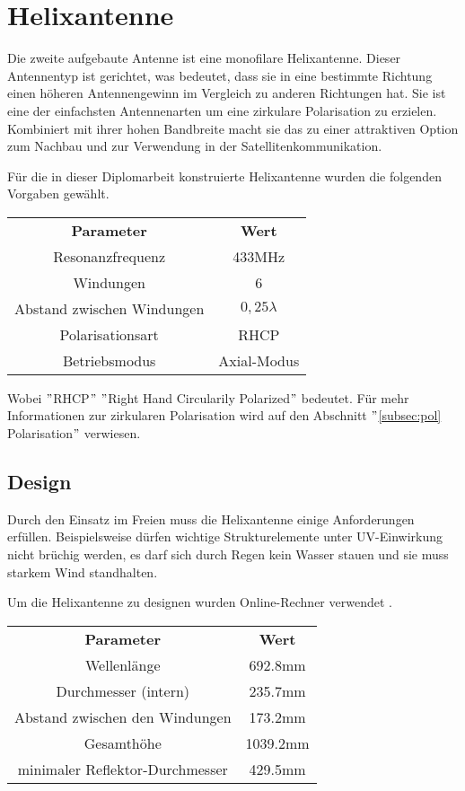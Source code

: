 \chapter{Helixantenne}
Die zweite aufgebaute Antenne ist eine monofilare Helixantenne. Dieser Antennentyp ist gerichtet, was bedeutet, dass sie in eine bestimmte Richtung einen höheren Antennengewinn im Vergleich zu anderen Richtungen hat. Sie ist eine der einfachsten Antennenarten um eine zirkulare Polarisation zu erzielen. Kombiniert mit ihrer hohen Bandbreite macht sie das zu einer attraktiven Option zum Nachbau und zur Verwendung in der Satellitenkommunikation.

Für die in dieser Diplomarbeit konstruierte Helixantenne wurden die folgenden Vorgaben gewählt.

\begin{center}
	\begin{tabular}{|c|c|}
	\textbf{Parameter} & \textbf{Wert}\\
	Resonanzfrequenz & 433MHz\\
	Windungen & 6\\
	Abstand zwischen Windungen & $0,25\lambda$\\
	Polarisationsart & RHCP\\
	Betriebsmodus & Axial-Modus
\end{tabular}
\end{center}

Wobei $"$RHCP$"$ $"$Right Hand Circularily Polarized$"$ bedeutet. Für mehr Informationen zur zirkularen Polarisation wird auf den Abschnitt $"$\ref{subsec:pol} Polarisation$"$ verwiesen.

\section{Design}
Durch den Einsatz im Freien muss die Helixantenne einige Anforderungen erfüllen. Beispielsweise dürfen wichtige Strukturelemente unter UV-Einwirkung nicht brüchig werden, es darf sich durch Regen kein Wasser stauen und sie muss starkem Wind standhalten. 

Um die Helixantenne zu designen wurden Online-Rechner verwendet \cite{calculator_daycounter, calculator_jcoppens}.

\begin{center}
	\begin{tabular}{|c|c|}
	\textbf{Parameter} & \textbf{Wert} \\
	Wellenlänge &  692.8mm\\
	Durchmesser (intern) & 235.7mm\\
	Abstand zwischen den Windungen & 173.2mm\\
	Gesamthöhe & 1039.2mm\\
	minimaler Reflektor-Durchmesser & 429.5mm
\end{tabular}
\end{center}

